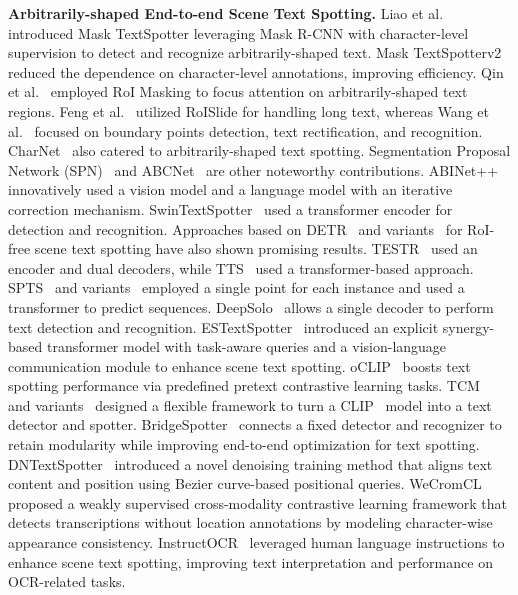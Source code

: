     \noindent\textbf{Arbitrarily-shaped End-to-end Scene Text Spotting.} 
    Liao et al.~\cite{lyu2018mask} introduced Mask TextSpotter leveraging Mask R-CNN with character-level supervision to detect and recognize arbitrarily-shaped text. Mask TextSpotterv2~\cite{liao2019mask} reduced the dependence on character-level annotations, improving efficiency. Qin et al.~\cite{qin2019towards} employed RoI Masking to focus attention on arbitrarily-shaped text regions. Feng et al.~\cite{feng2019textdragon} utilized RoISlide for handling long text, whereas Wang et al.~\cite{wang2020all} focused on boundary points detection, text rectification, and recognition. CharNet~\cite{xing2019convolutional} also catered to arbitrarily-shaped text spotting. Segmentation Proposal Network (SPN)~\cite{Liao2020MaskTV} and ABCNet~\cite{Liu2020ABCNetRS} are other noteworthy contributions. ABINet++~\cite{Fang2022ABINetAB} innovatively used a vision model and a language model with an iterative correction mechanism. SwinTextSpotter~\cite{huang2022swintextspotter} used a transformer encoder for detection and recognition. Approaches based on DETR~\cite{Carion2020EndtoEndOD} and variants~\cite{Zhu2020DeformableDD} for RoI-free scene text spotting have also shown promising results. TESTR~\cite{Zhang2022TextST} used an encoder and dual decoders, while TTS~\cite{Kittenplon2022TowardsWT} used a transformer-based approach. SPTS~\cite{Peng2021SPTSST} and variants~\cite{liu2023spts} employed a single point for each instance and used a transformer to predict sequences. DeepSolo~\cite{ye2023deepsolo} allows a single decoder to perform text detection and recognition. ESTextSpotter~\cite{Huang2023ESTextSpotterTB} introduced an explicit synergy-based transformer model with task-aware queries and a vision-language communication module to enhance scene text spotting. oCLIP~\cite{Xue2022LanguageMA} boosts text spotting performance via predefined pretext contrastive learning tasks. TCM~\cite{Yu2023TurningAC} and variants~\cite{Yu2024TurningAC} designed a flexible framework to turn a CLIP~\cite{Radford2021LearningTV} model into a text detector and spotter. BridgeSpotter~\cite{Huang_2024_CVPR} connects a fixed detector and recognizer to retain modularity while improving end-to-end optimization for text spotting. DNTextSpotter~\cite{DNTextSpotter} introduced a novel denoising training method that aligns text content and position using Bezier curve-based positional queries. WeCromCL~\cite{Wu2024WeCromCLWS} proposed a weakly supervised cross-modality contrastive learning framework that detects transcriptions without location annotations by modeling character-wise appearance consistency. InstructOCR~\cite{Duan2024InstructOCRIB} leveraged human language instructions to enhance scene text spotting, improving text interpretation and performance on OCR-related tasks. 

